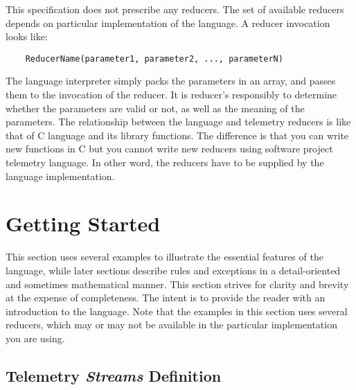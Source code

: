 This specification does not prescribe any reducers. The set of available reducers depends on particular implementation of the language. A reducer invocation looks like:
\begin{verbatim}
    ReducerName(parameter1, parameter2, ..., parameterN)
\end{verbatim}
The language interpreter simply packs the parameters in an array, and passes them to the invocation of the reducer. It is reducer's responsibly to determine whether the parameters are valid or not, as well as the meaning of the parameters. The relationship between the language and telemetry reducers is like that of C language and its library functions. The difference is that you can write new functions in C but you cannot write new reducers using software project telemetry language. In other word, the reducers have to be supplied by the language implementation.





\section{Getting Started}   \label{TelemetryLanguageSpecification:GettingStarted}


This section uses several examples to illustrate the essential features of the language, while later sections describe rules and exceptions in a detail-oriented and sometimes mathematical manner. This section strives for clarity and brevity at the expense of completeness. The intent is to provide the reader with an introduction to the language. Note that the examples in this section uses several reducers, which may or may not be available in the particular implementation you are using.


\subsection{Telemetry \textit{Streams} Definition}

